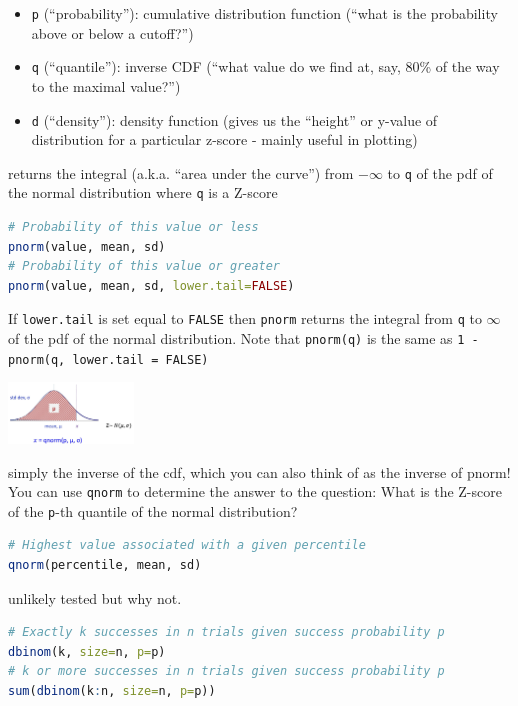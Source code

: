 \documentclass[10pt,landscape]{article}
\newcommand{\Blue}[1]{\noindent{\textbf{\textcolor{Blue}{#1 -}}}}
\newcommand{\Red}[1]{\noindent{\textbf{\textcolor{BrickRed}{#1 -}}}}
\begin{document}
\begin{multicols}{4}
\begin{itemize}
    \item \texttt{p} (``probability''): cumulative distribution function (“what is the probability above or below a cutoff?”)
    \item \texttt{q} (``quantile''): inverse CDF (“what value do we find at, say, 80\% of the way to the maximal value?”)
    \item \texttt{d} (``density''): density function (gives us the “height” or y-value of distribution for a particular z-score - mainly useful in plotting)
\end{itemize}

\Red{\texttt{pnorm}} returns the integral (a.k.a. ``area under the curve'') from $-\infty$ to \texttt{q} of the pdf of the
normal distribution where \texttt{q} is a Z-score
\lstset{breaklines=true}
\begin{lstlisting}[language=R]
# Probability of this value or less
pnorm(value, mean, sd)
# Probability of this value or greater
pnorm(value, mean, sd, lower.tail=FALSE)
\end{lstlisting}
If \texttt{lower.tail} is set equal to \texttt{FALSE} then \texttt{pnorm} returns the integral from \texttt{q} to
$\infty$ of the pdf of the normal distribution. Note that \texttt{pnorm(q)} is the same as
\texttt{1 - pnorm(q, lower.tail = FALSE)}

\includegraphics[width=0.25\textwidth]{qnorm.jpg}

\Red{\texttt{qnorm}} simply the inverse of the cdf, which you can also think of as the inverse of pnorm! You can use
\texttt{qnorm} to determine the answer to the question: What is the Z-score of the \texttt{p}-th quantile of the normal
distribution?

\begin{lstlisting}[language=R]
# Highest value associated with a given percentile
qnorm(percentile, mean, sd)
\end{lstlisting}

\Blue{Binomial functions} unlikely tested but why not.
\begin{lstlisting}[language=R]
# Exactly k successes in n trials given success probability p
dbinom(k, size=n, p=p)
# k or more successes in n trials given success probability p
sum(dbinom(k:n, size=n, p=p))
\end{lstlisting}

\end{multicols}
\end{document}
